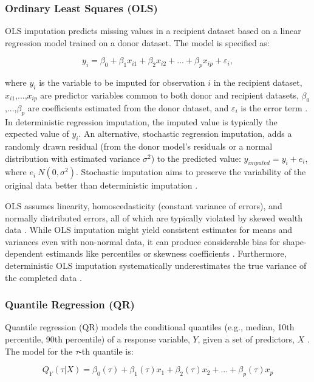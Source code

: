 \subsubsection{Ordinary Least Squares (OLS)}

OLS imputation predicts missing values in a recipient dataset based on a linear regression model trained on a donor dataset. The model is specified as:

$$y_i = \beta_0 + \beta_1 x_{i1} + \beta_2 x_{i2} + ... + \beta_p x_{ip} + \varepsilon_i,$$

where $y_i$ is the variable to be imputed for observation $i$ in the recipient dataset, $x_{i1}$,...,$x_{ip}$ are predictor variables common to both donor and recipient datasets, $\beta_0$,...,$\beta_p$ are coefficients estimated from the donor dataset, and $\varepsilon_i$ is the error term \citep{bruch2023imputation}. In deterministic regression imputation, the imputed value is typically the expected value of $y_i$. An alternative, stochastic regression imputation, adds a randomly drawn residual (from the donor model's residuals or a normal distribution with estimated variance $\sigma^2$) to the predicted value: $y_{imputed} = y_i + e_i$, where $e_i~N(0,\sigma^2)$. Stochastic imputation aims to preserve the variability of the original data better than deterministic imputation \citep{anil_regression}.

OLS assumes linearity, homoscedasticity (constant variance of errors), and normally distributed errors, all of which are typically violated by skewed wealth data \citep{vonhippel2007should}. While OLS imputation might yield consistent estimates for means and variances even with non-normal data, it can produce considerable bias for shape-dependent estimands like percentiles or skewness coefficients \citep{vonhippel2007should}. Furthermore, deterministic OLS imputation systematically underestimates the true variance of the completed data \citep{barcelo2008impact}. 

\subsubsection{Quantile Regression (QR)}

Quantile regression (QR) models the conditional quantiles (e.g., median, 10th percentile, 90th percentile) of a response variable, $Y$, given a set of predictors, $X$ \citep{koenker1978regression}. The model for the $\tau$-th quantile is:

$$Q_{Y}(\tau|X) = \beta_0(\tau) + \beta_1(\tau)x_1 + \beta_2(\tau)x_2 + ... + \beta_p(\tau)x_p$$

